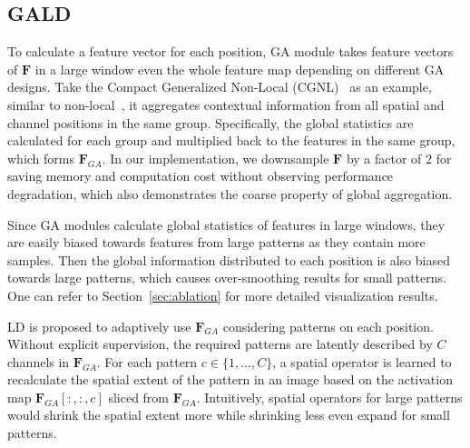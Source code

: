 \documentclass{bmvc2k}
\begin{document}
\subsection{GALD}
To calculate a feature vector for each position, GA module takes feature vectors of $\mathbf{F}$ in a large window even the whole feature map depending on different GA designs. Take the Compact Generalized Non-Local (CGNL)~\cite{cgnl} as an example, similar to non-local~\cite{Nonlocal}, it aggregates contextual information from all spatial and channel positions in the same group. 
Specifically,  the global statistics are calculated for each group and multiplied back to the features in the same group, which forms $\mathbf{F}_{GA}$. In our implementation, we downsample $\mathbf{F}$ by a factor of $2$ for saving memory and computation cost without observing performance degradation, which also demonstrates the coarse property of global aggregation. 

Since GA modules calculate global statistics of features in large windows, they are easily biased towards features from large patterns as they contain more samples. Then the global information distributed to each position is also biased towards large patterns, which causes over-smoothing results for small patterns. One can refer to Section~\ref{sec:ablation} for more detailed visualization results.

LD is proposed to adaptively use $\mathbf{F}_{GA}$ considering patterns on each position. Without explicit supervision, the required patterns are latently described by $C$ channels in $\mathbf{F}_{GA}$. For each pattern $c\in\{1,...,C\}$, a spatial operator is learned to recalculate the spatial extent of the pattern in an image based on the activation map  $\mathbf{F}_{GA}[:,:,c]$ sliced from $\mathbf{F}_{GA}$. Intuitively, spatial operators for large patterns would shrink the spatial extent more while shrinking less even expand for small patterns.
\end{document}
